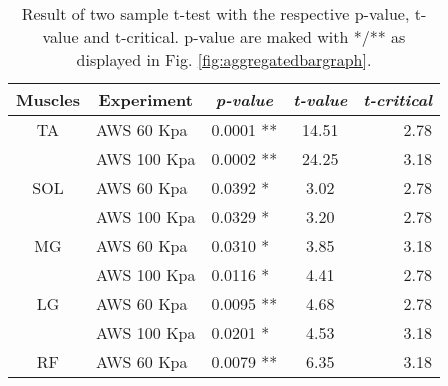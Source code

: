 \documentclass[letterpaper, 10 pt, conference]{ieeeconf}  %
\begin{document}
\begin{table}[]
	\centering
	\caption{Result of two sample t-test with the respective p-value, t-value and t-critical. p-value are maked with */** as displayed in Fig. \ref{fig:aggregatedbargraph}.}
	\label{t-test}
	\begin{tabular}{@{}cllcr@{}}
		\toprule
		\textbf{Muscles} & \multicolumn{1}{c}{\textbf{Experiment}} & \multicolumn{1}{c}{\textit{\textbf{p-value}}} & \textit{\textbf{t-value}} & \multicolumn{1}{c}{\textit{\textbf{t-critical}}} \\ \midrule
		TA               & AWS 60 Kpa                              & 0.0001 **                                     & 14.51                     & 2.78                                             \\
		& AWS 100 Kpa                             & 0.0002 **                                     & 24.25                     & 3.18                                             \\
		SOL              & AWS 60 Kpa                              & 0.0392 *                                      & 3.02                      & 2.78                                             \\
		& AWS 100 Kpa                             & 0.0329 *                                      & 3.20                      & 2.78                                             \\
		MG               & AWS 60 Kpa                              & 0.0310 *                                      & 3.85                      & 3.18                                             \\
		& AWS 100 Kpa                             & 0.0116 *                                      & 4.41                      & 2.78                                             \\
		LG               & AWS 60 Kpa                              & 0.0095 **                                     & 4.68                      & 2.78                                             \\
		& AWS 100 Kpa                             & 0.0201 *                                      & 4.53                      & 3.18                                             \\
		RF               & AWS 60 Kpa                              & 0.0079 **                                     & 6.35                      & 3.18                                             \\

\end{tabular}
\end{table}
\end{document}
